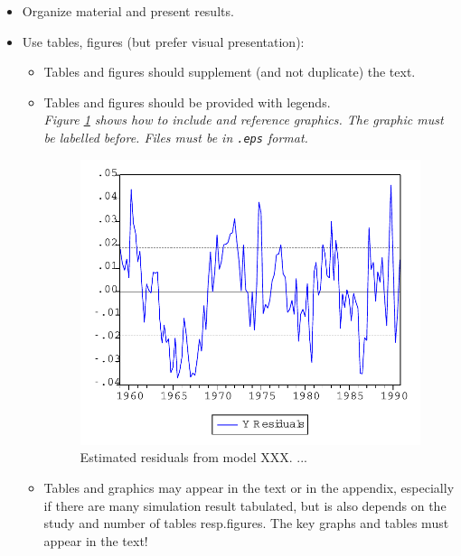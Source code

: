 \begin{itemize}
    \item Organize material and present results.
    \item Use tables, figures (but prefer visual presentation):
        \begin{itemize}
            \item Tables and figures should supplement (and not duplicate) the text.
            \item Tables and figures should be provided with legends.\\
                {\it Figure \ref{Fig:Resids} shows how to include and reference
                graphics. The graphic must be labelled before. Files must be in
                \texttt{.eps} format.}

                \begin{figure}[ht]
                \begin{center}
                    \includegraphics[scale=0.5,angle=0]{graph}
                    \caption{Estimated residuals from model XXX. ...}
                    \label{Fig:Resids}
                \end{center}
                \end{figure}

            \item Tables and graphics may appear in the text or in the appendix, especially if there are many simulation result tabulated, but is also depends on the study and number of tables resp.figures. The key graphs and tables must appear in the text!
        \end{itemize}
 \end{itemize}   

